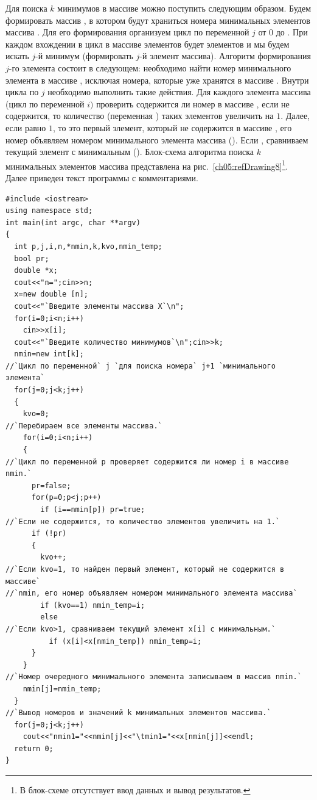 Для поиска $k$ минимумов в массиве можно поступить следующим образом. Будем формировать массив
, в котором будут храниться номера минимальных элементов массива . Для его
формирования организуем цикл по переменной $j$ от 0 до . При
каждом вхождении в цикл в массиве  элементов будет  элементов и мы будем
искать $j$-й минимум (формировать $j$-й элемент массива). Алгоритм формирования
$j$-го элемента состоит в следующем: необходимо найти номер минимального элемента в массиве ,
исключая номера, которые уже хранятся в массиве . Внутри цикла по $j$
необходимо выполнить такие действия. Для каждого элемента массива  (цикл по переменной
$i)$ проверить содержится ли номер в массиве , если не содержится, то
количество (переменная ) таких элементов увеличить на $1$. Далее, если
 равно $1$, то это первый элемент, который не содержится в массиве
, его номер объявляем номером минимального элемента массива ().
Если , сравниваем текущий элемент
 с минимальным ().
Блок-схема алгоритма поиска $k$ минимальных элементов массива представлена на рис.~\ref{ch05:refDrawing8}\footnote{В
блок-схеме отсутствует ввод данных и вывод результатов.}.  Далее приведен текст программы с комментариями.
\begin{lstlisting}
#include <iostream>
using namespace std;
int main(int argc, char **argv)
{
  int p,j,i,n,*nmin,k,kvo,nmin_temp;
  bool pr;
  double *x;
  cout<<"n=";cin>>n;
  x=new double [n];
  cout<<"`Введите элементы массива Х`\n";
  for(i=0;i<n;i++)
    cin>>x[i];
  cout<<"`Введите количество минимумов`\n";cin>>k;
  nmin=new int[k];
//`Цикл по переменной` j `для поиска номера` j+1 `минимального элемента` 
  for(j=0;j<k;j++)
  {
    kvo=0;
//`Перебираем все элементы массива.`
    for(i=0;i<n;i++)
    {
//`Цикл по переменной p проверяет содержится ли номер i в массиве nmin.`
      pr=false;
      for(p=0;p<j;p++)
        if (i==nmin[p]) pr=true;
//`Если не содержится, то количество элементов увеличить на 1.`
      if (!pr) 
      {
        kvo++;
//`Если kvo=1, то найден первый элемент, который не содержится в массиве`
//`nmin, его номер объявляем номером минимального элемента массива`
        if (kvo==1) nmin_temp=i;
        else
//`Если kvo>1, сравниваем текущий элемент x[i] с минимальным.`
          if (x[i]<x[nmin_temp]) nmin_temp=i;
      }
    }
//`Номер очередного минимального элемента записываем в массив nmin.`
    nmin[j]=nmin_temp;		
  }
//`Вывод номеров и значений k минимальных элементов массива.`
  for(j=0;j<k;j++)
    cout<<"nmin1="<<nmin[j]<<"\tmin1="<<x[nmin[j]]<<endl;
  return 0;
}
\end{lstlisting}

